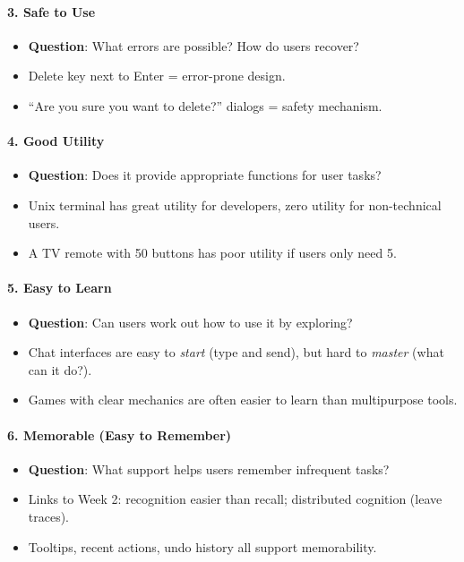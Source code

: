\paragraph*{3. Safe to Use}
\begin{itemize}
  \item \textbf{Question}: What errors are possible? How do users recover?
  \item Delete key next to Enter = error-prone design.
  \item ``Are you sure you want to delete?'' dialogs = safety mechanism.
\end{itemize}

\paragraph*{4. Good Utility}
\begin{itemize}
  \item \textbf{Question}: Does it provide appropriate functions for user tasks?
  \item Unix terminal has great utility for developers, zero utility for non-technical users.
  \item A TV remote with 50 buttons has poor utility if users only need 5.
\end{itemize}

\paragraph*{5. Easy to Learn}
\begin{itemize}
  \item \textbf{Question}: Can users work out how to use it by exploring?
  \item Chat interfaces are easy to \textit{start} (type and send), but hard to \textit{master} (what can it do?).
  \item Games with clear mechanics are often easier to learn than multipurpose tools.
\end{itemize}

\paragraph*{6. Memorable (Easy to Remember)}
\begin{itemize}
  \item \textbf{Question}: What support helps users remember infrequent tasks?
  \item Links to Week 2: recognition easier than recall; distributed cognition (leave traces).
  \item Tooltips, recent actions, undo history all support memorability.
\end{itemize}


